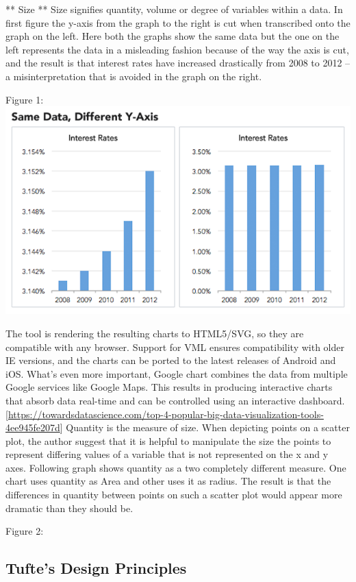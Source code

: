 \documentclass[]{book}
\theoremstyle{definition}
\theoremstyle{definition}
\theoremstyle{definition}
\theoremstyle{remark}
\begin{document}
** Size ** Size signifies quantity, volume or degree of variables within
a data. In first figure the y-axis from the graph to the right is cut
when transcribed onto the graph on the left. Here both the graphs show
the same data but the one on the left represents the data in a
misleading fashion because of the way the axis is cut, and the result is
that interest rates have increased drastically from 2008 to 2012 -- a
misinterpretation that is avoided in the graph on the right.

Figure 1: \includegraphics{images/Size1.png}

The tool is rendering the resulting charts to HTML5/SVG, so they are
compatible with any browser. Support for VML ensures compatibility with
older IE versions, and the charts can be ported to the latest releases
of Android and iOS. What's even more important, Google chart combines
the data from multiple Google services like Google Maps. This results in
producing interactive charts that absorb data real-time and can be
controlled using an interactive dashboard.\\
{[}\url{https://towardsdatascience.com/top-4-popular-big-data-visualization-tools-4ee945fe207d}{]}
Quantity is the measure of size. When depicting points on a scatter
plot, the author suggest that it is helpful to manipulate the size the
points to represent differing values of a variable that is not
represented on the x and y axes. Following graph shows quantity as a two
completely different measure. One chart uses quantity as Area and other
uses it as radius. The result is that the differences in quantity
between points on such a scatter plot would appear more dramatic than
they should be.

Figure 2:

\subsection{Tufte's Design Principles}\label{tuftes-design-principles}
\end{document}
